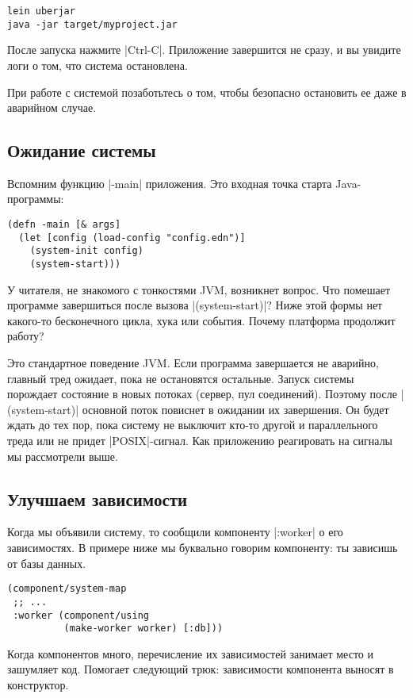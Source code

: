 \begin{verbatim}
lein uberjar
java -jar target/myproject.jar
\end{verbatim}

После запуска нажмите \spverb|Ctrl-C|. Приложение завершится не сразу, и вы увидите
логи о том, что система остановлена.

При работе с системой позаботьтесь о том, чтобы безопасно остановить ее даже в
аварийном случае.

\subsection{Ожидание системы}

Вспомним функцию \spverb|-main| приложения. Это входная точка старта Java-программы:

\begin{verbatim}
(defn -main [& args]
  (let [config (load-config "config.edn")]
    (system-init config)
    (system-start)))
\end{verbatim}

У читателя, не знакомого с тонкостями JVM, возникнет вопрос. Что помешает
программе завершиться после вызова \spverb|(system-start)|? Ниже этой формы нет
какого-то бесконечного цикла, хука или события. Почему платформа продолжит
работу?

Это стандартное поведение JVM. Если программа завершается не аварийно, главный
тред ожидает, пока не остановятся остальные. Запуск системы порождает состояние
в новых потоках (сервер, пул соединений). Поэтому после \spverb|(system-start)|
основной поток повиснет в ожидании их завершения. Он будет ждать до тех пор,
пока систему не выключит кто-то другой и параллельного треда или не придет
\spverb|POSIX|-сигнал. Как приложению реагировать на сигналы мы рассмотрели выше.

\subsection{Улучшаем зависимости}

Когда мы объявили систему, то сообщили компоненту \spverb|:worker| о его
зависимостях. В примере ниже мы буквально говорим компоненту: ты зависишь от
базы данных.

\begin{verbatim}
(component/system-map
 ;; ...
 :worker (component/using
          (make-worker worker) [:db]))
\end{verbatim}

Когда компонентов много, перечисление их зависимостей занимает место и зашумляет
код. Помогает следующий трюк: зависимости компонента выносят в конструктор.

